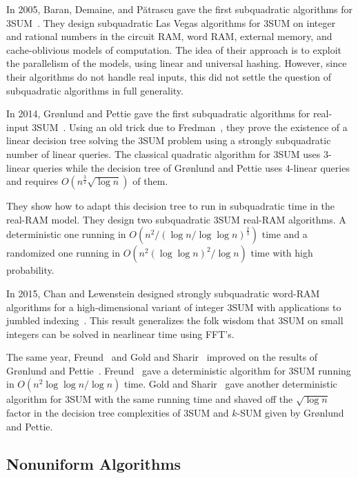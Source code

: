 In 2005, Baran, Demaine, and P{\u a}tra{\cb s}cu
gave the first subquadratic algorithms for
3SUM~\cite{BDP08}. They design subquadratic Las Vegas
algorithms for 3SUM on integer and
rational numbers in the circuit RAM, word RAM, external memory, and
cache-oblivious models of computation. The idea of their approach is to exploit
the parallelism of the models, using linear and universal hashing. However,
since their algorithms do not handle real inputs,
this did not settle the question of subquadratic algorithms in full
generality.

In 2014, Gr{\o}nlund and Pettie gave
the first subquadratic algorithms for real-input 3SUM~\cite{GP18}.
Using an old trick due to Fredman~\cite{Fr76},
they prove the existence of a linear decision tree
solving the 3SUM problem using a strongly subquadratic number of linear queries.
The classical quadratic algorithm for 3SUM uses \(3\)-linear queries
while the decision tree of Gr{\o}nlund and Pettie uses \(4\)-linear queries and
requires $O(n^{\frac{3}{2}} \sqrt{\log n})$ of them.


They show how to adapt this decision tree to run in subquadratic time in the
real-RAM model. They design two subquadratic 3SUM
real-RAM algorithms. A deterministic one running in
$O(n^2/{(\log n/\log \log n)}^{\frac{2}{3}})$
time and a randomized one running in
$O(n^2 {(\log \log n)}^2 / \log n)$ time with high probability.

In 2015, Chan and Lewenstein designed strongly subquadratic word-RAM algorithms
for a high-dimensional variant of integer 3SUM with applications to jumbled
indexing~\cite{CL15}. This result generalizes the folk wisdom that 3SUM on small
integers can be solved in nearlinear time using FFT's.

The same year, Freund~\cite{Fr15} and Gold and Sharir~\cite{GS15}
improved on the results of Gr{\o}nlund and Pettie~\cite{GP18}.
Freund~\cite{Fr15} gave a deterministic algorithm for 3SUM running in \(O(
{n^2\log \log n}/{\log n})\) time. Gold and Sharir~\cite{GS15} gave another
deterministic algorithm for 3SUM with the same running time and shaved off the
$\sqrt{\log n}$ factor in the decision tree complexities of 3SUM and \(k\)-SUM
given by Gr{\o}nlund and Pettie.
%


\subsection{Nonuniform Algorithms}%
\label{sec:history:sum:nonuniform-algorithms}

